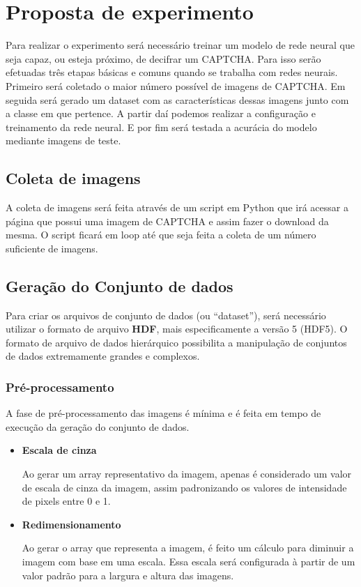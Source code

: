 \chapter{Proposta de experimento}

Para realizar o experimento será necessário treinar um modelo de rede
neural que seja capaz, ou esteja próximo, de decifrar um CAPTCHA. Para
isso serão efetuadas três etapas básicas e comuns quando se trabalha
com redes neurais. Primeiro será coletado o maior número possível de
imagens de CAPTCHA. Em seguida será gerado um dataset com as
características dessas imagens junto com a classe em que pertence. A
partir daí podemos realizar a configuração e treinamento da rede
neural. E por fim será testada a acurácia do modelo mediante imagens
de teste.

\section{Coleta de imagens}

A coleta de imagens será feita através de um script em Python que irá
acessar a página que possui uma imagem de CAPTCHA e assim fazer o
download da mesma. O script ficará em loop até que seja feita a coleta
de um número suficiente de imagens.

\section{Geração do Conjunto de dados}

Para criar os arquivos de conjunto de dados (ou ``dataset''), será
necessário utilizar o formato de arquivo {\bf HDF}, mais
especificamente a versão 5 (HDF5). O formato de arquivo de dados
hierárquico possibilita a manipulação de conjuntos de dados
extremamente grandes e complexos.

\subsection{Pré-processamento}

A fase de pré-processamento das imagens é mínima e é feita em tempo de
execução da geração do conjunto de dados.

\begin{itemize}
\item{\bf Escala de cinza}

Ao gerar um array representativo da imagem, apenas é considerado um
valor de escala de cinza da imagem, assim padronizando os valores de
intensidade de pixels entre 0 e 1.

\item{\bf Redimensionamento}

Ao gerar o array que representa a imagem, é feito um cálculo para
diminuir a imagem com base em uma escala. Essa escala será configurada
à partir de um valor padrão para a largura e altura das imagens.

\end{itemize}

